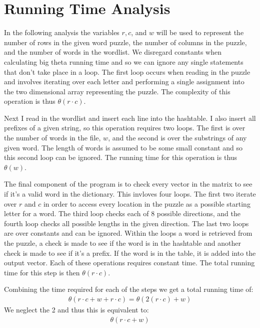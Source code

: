 \documentclass{article}
\begin{document}
\thispagestyle{fancy}

\section{Running Time Analysis}
In the following analysis the variables $r, c$, and $w$ will be used to represent the number of rows in the given word puzzle, the number of columns in the puzzle, and the number of words in the wordlist. We disregard constants when calculating big theta running time and so we can ignore any single statements that don't take place in a loop. The first loop occurs when reading in the puzzle and involves iterating over each letter and performing a single assignment into the two dimensional array representing the puzzle. The complexity of this operation is thus $\theta(r\cdot c)$.

Next I read in the wordlist and insert each line into the hashtable. I also insert all prefixes of a given string, so this operation requires two loops. The first is over the number of words in the file, $w$, and the second is over the substrings of any given word. The length of words is assumed to be some small constant and so this second loop can be ignored. The running time for this operation is thus $\theta(w)$.

The final component of the program is to check every vector in the matrix to see if it's a valid word in the dictionary. This invloves four loops. The first two iterate over $r$ and $c$ in order to access every location in the puzzle as a possible starting letter for a word. The third loop checks each of 8 possible directions, and the fourth loop checks all possible lengths in the given direction. The last two loops are over constants and can be ignored. Within the loops a word is retrieved from the puzzle, a check is made to see if the word is in the hashtable and another check is made to see if it's a prefix. If the word is in the table, it is added into the output vector. Each of these operations requires constant time.
The total running time for this step is then $\theta(r \cdot c)$.

Combining the time required for each of the steps we get a total running time of:
\begin{align}
    \theta(r\cdot c + w + r\cdot c) = \theta(2(r\cdot c) + w)
\end{align}
We neglect the 2 and thus this is equivalent to:
\begin{align}
    \theta(r\cdot c + w)
\end{align}
\end{document}
